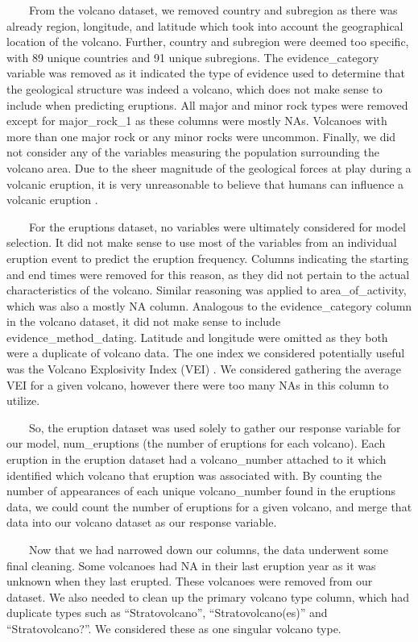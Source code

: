 \documentclass[
  12pt,
]{article}
\begin{document}
~~~~From the volcano dataset, we removed country and subregion as there
was already region, longitude, and latitude which took into account the
geographical location of the volcano. Further, country and subregion
were deemed too specific, with 89 unique countries and 91 unique
subregions. The evidence\_category variable was removed as it indicated
the type of evidence used to determine that the geological structure was
indeed a volcano, which does not make sense to include when predicting
eruptions. All major and minor rock types were removed except for
major\_rock\_1 as these columns were mostly NAs. Volcanoes with more
than one major rock or any minor rocks were uncommon. Finally, we did
not consider any of the variables measuring the population surrounding
the volcano area. Due to the sheer magnitude of the geological forces at
play during a volcanic eruption, it is very unreasonable to believe that
humans can influence a volcanic eruption \citep{layton2023}.

~~~~For the eruptions dataset, no variables were ultimately considered
for model selection. It did not make sense to use most of the variables
from an individual eruption event to predict the eruption frequency.
Columns indicating the starting and end times were removed for this
reason, as they did not pertain to the actual characteristics of the
volcano. Similar reasoning was applied to area\_of\_activity, which was
also a mostly NA column. Analogous to the evidence\_category column in
the volcano dataset, it did not make sense to include
evidence\_method\_dating. Latitude and longitude were omitted as they
both were a duplicate of volcano data. The one index we considered
potentially useful was the Volcano Explosivity Index (VEI)
\citep{wikipedia2025}. We considered gathering the average VEI for a
given volcano, however there were too many NAs in this column to
utilize.

~~~~So, the eruption dataset was used solely to gather our response
variable for our model, num\_eruptions (the number of eruptions for each
volcano). Each eruption in the eruption dataset had a volcano\_number
attached to it which identified which volcano that eruption was
associated with. By counting the number of appearances of each unique
volcano\_number found in the eruptions data, we could count the number
of eruptions for a given volcano, and merge that data into our volcano
dataset as our response variable.

~~~~Now that we had narrowed down our columns, the data underwent some
final cleaning. Some volcanoes had NA in their last eruption year as it
was unknown when they last erupted. These volcanoes were removed from
our dataset. We also needed to clean up the primary volcano type column,
which had duplicate types such as ``Stratovolcano'',
``Stratovolcano(es)'' and ``Stratovolcano?''. We considered these as one
singular volcano type.
\end{document}
